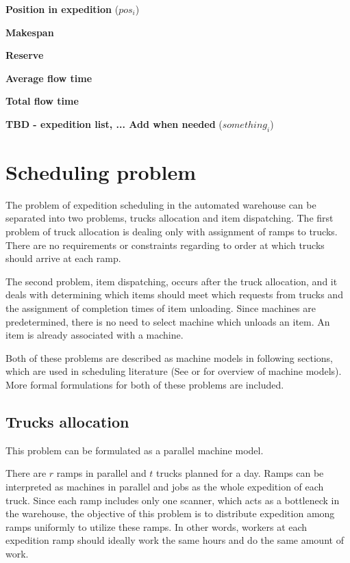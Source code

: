 \documentclass{ctuthesis}
\begin{document}
\noindent \textbf{Position in expedition} ($pos_i$)

\noindent \textbf{Makespan}

\noindent \textbf{Reserve}

\noindent \textbf{Average flow time}

\noindent \textbf{Total flow time}

\noindent \textbf{TBD - expedition list, ... Add when needed} ($something_i$)


\section{Scheduling problem}
 
 The problem of expedition scheduling in the automated warehouse can be separated into two problems, trucks allocation and item dispatching. The first problem of truck allocation is dealing only with assignment of ramps to trucks. There are no requirements or constraints regarding to order at which trucks should arrive at each ramp.
 
 The second problem, item dispatching, occurs after the truck allocation, and it deals with determining which items should meet which requests from trucks and the assignment of completion times of item unloading. Since machines are predetermined, there is no need to select machine which unloads an item. An item is already associated with a machine.
 
Both of these problems are described as machine models in following sections, which are used in scheduling literature (See \cite{pinedo} or \cite{bucker} for overview of machine models). More formal formulations for both of these problems are included.
 
 \subsection{Trucks allocation}
 \label{subsec:truckallocation}
This problem can be formulated as a parallel machine model.
 
 There are $r$ ramps in parallel and $t$ trucks planned for a day. Ramps can be interpreted as machines in parallel and jobs as the whole expedition of each truck. Since each ramp includes only one scanner, which acts as a bottleneck in the warehouse, the objective of this problem is to distribute expedition among ramps uniformly to utilize these ramps. In other words, workers at each expedition ramp should ideally work the same hours and do the same amount of work. 
 
\end{document}
